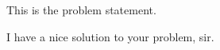 \begin{exercise}
This is the problem statement.

\begin{solution}
    I have a nice solution to your problem, sir.
\end{solution}
\end{exercise}
